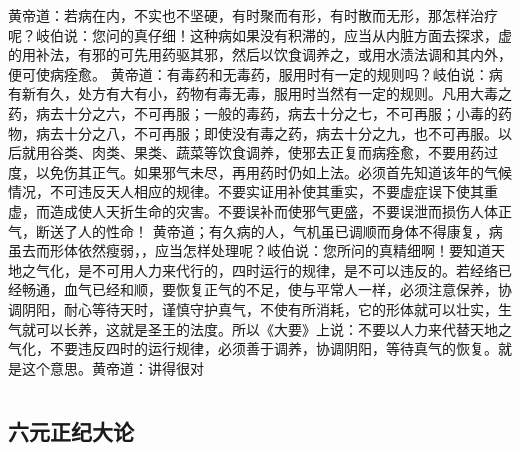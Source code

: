 \documentclass[a4paper,12pt,UTF8,twoside]{ctexbook}
\begin{document}
黄帝道：若病在内，不实也不坚硬，有时聚而有形，有时散而无形，那怎样治疗呢？岐伯说：您问的真仔细！这种病如果没有积滞的，应当从内脏方面去探求，虚的用补法，有邪的可先用药驱其邪，然后以饮食调养之，或用水渍法调和其内外，便可使病痊愈。
黄帝道：有毒药和无毒药，服用时有一定的规则吗？岐伯说：病有新有久，处方有大有小，药物有毒无毒，服用时当然有一定的规则。凡用大毒之药，病去十分之六，不可再服；一般的毒药，病去十分之七，不可再服；小毒的药物，病去十分之八，不可再服；即使没有毒之药，病去十分之九，也不可再服。以后就用谷类、肉类、果类、蔬菜等饮食调养，使邪去正复而病痊愈，不要用药过度，以免伤其正气。如果邪气未尽，再用药时仍如上法。必须首先知道该年的气候情况，不可违反天人相应的规律。不要实证用补使其重实，不要虚症误下使其重虚，而造成使人天折生命的灾害。不要误补而使邪气更盛，不要误泄而损伤人体正气，断送了人的性命！
黄帝道；有久病的人，气机虽已调顺而身体不得康复，病虽去而形体依然瘦弱，，应当怎样处理呢？岐伯说：您所问的真精细啊！要知道天地之气化，是不可用人力来代行的，四时运行的规律，是不可以违反的。若经络已经畅通，血气已经和顺，要恢复正气的不足，使与平常人一样，必须注意保养，协调阴阳，耐心等待天时，谨慎守护真气，不使有所消耗，它的形体就可以壮实，生气就可以长养，这就是圣王的法度。所以《大要》上说：不要以人力来代替天地之气化，不要违反四时的运行规律，必须善于调养，协调阴阳，等待真气的恢复。就是这个意思。黄帝道：讲得很对

\part{}

\chapter{六元正纪大论}
\end{document}

